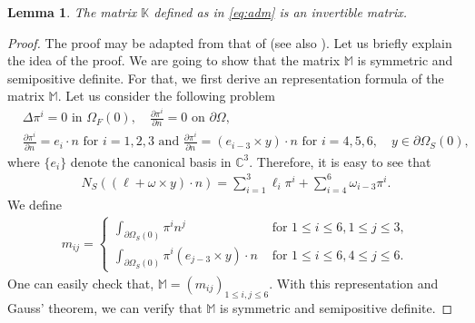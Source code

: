 \documentclass[12pt,a4paper,reqno]{amsart}
\newtheorem{lemma}[theorem]{Lemma}
\theoremstyle{definition}
\theoremstyle{remark}
\numberwithin{equation}{section}
\newcommand{\oso}{\Omega_{S}(0)}
\newcommand{\ofo}{\Omega_{F}(0)}
\newcommand{\ds}{\displaystyle}
\newcommand{\poso}{\partial\oso}
\begin{document}
\begin{lemma} \label{lem:inv-adm}
The matrix $\mathbb{K}$ defined as in \eqref{eq:adm} is an invertible matrix.
\end{lemma}
\begin{proof}
The proof may be adapted from that of \cite[Lemma 4.6]{Gal02} (see also \cite[Lemma 4.3]{Gei13}).  Let us briefly explain the idea of the proof.  We are going to show that the matrix $\mathbb{M}$ is symmetric and semipositive definite. For that, we first derive an representation formula of the matrix $\mathbb{M}.$ Let us consider the following problem
\begin{align*}
&\Delta  \pi^{i} = 0 \mbox{ in } \ofo, \quad \frac{\partial  \pi^{i}}{\partial n} = 0 \mbox{ on } \partial\Omega, \quad \\
&\frac{\partial  \pi^{i}}{\partial n} = e_{i} \cdot n \mbox{ for }  i =1,2,3 \mbox{ and } \frac{\partial  \pi^{i}}{\partial n} = (e_{i-3} \times y) \cdot n \mbox{ for } i = 4,5,6, \quad y \in \partial \oso,
\end{align*}
where $\{e_{i}\}$ denote the canonical basis in $\mathbb{C}^{3}.$ Therefore, it is easy to see that
\begin{align*}
N_{S}((\ell + \omega \times y) \cdot n) = \sum_{i=1}^{3} \ell_{i} \pi^{i} + \sum_{i=4}^{6} \omega_{i-3} \pi^{i}.
\end{align*}
We define
\begin{align*}
m_{ij} =
\begin{cases}
\ds \int_{\partial\oso}  \pi^{i} n^{j} & \mbox{ for } 1 \leqslant i \leqslant 6, 1\leqslant  j \leqslant 3, \\
\ds \int_{\poso} \pi^{i}(e_{j-3} \times y) \cdot n & \mbox{ for } 1 \leqslant i \leqslant 6, 4\leqslant  j \leqslant 6.
\end{cases}
\end{align*}
One can easily check that, $\mathbb{M} = (m_{ij})_{1\leqslant i,j\leqslant 6}.$ With this representation and Gauss' theorem, we can  verify that $\mathbb{M}$ is symmetric and semipositive definite.
\end{proof}
\end{document}
